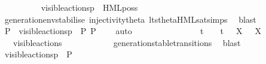 \begin{isabellebody}
\ \ \ \ \ \ \ \ \isamarkupfalse%
\ {\isacartoucheopen}{\isasymtheta}{\isacharbrackleft}{\kern0pt}visible{\isacharunderscore}{\kern0pt}actions{\isacharbrackright}{\kern0pt}{\isacharparenleft}{\kern0pt}p{\isacharparenright}{\kern0pt}\ {\isasymTurnstile}\ HML{\isacharunderscore}{\kern0pt}poss\ {\isasymalpha}\ {\isasymsigma}{\isacharparenleft}{\kern0pt}{\isasymphi}{\isacharparenright}{\kern0pt}{\isacartoucheclose}\isanewline
\ \ \ \ \ \ \ \ \ \ \isamarkupfalse%
\ generation{\isacharunderscore}{\kern0pt}env{\isacharunderscore}{\kern0pt}stabilise\ injectivity{\isacharunderscore}{\kern0pt}theta{\isacharparenleft}{\kern0pt}{}{\isacharparenright}{\kern0pt}\ lts{\isacharunderscore}{\kern0pt}theta{\isachardot}{\kern0pt}HML{\isacharunderscore}{\kern0pt}sat{\isachardot}{\kern0pt}simps{\isacharparenleft}{\kern0pt}{}{\isacharparenright}{\kern0pt}\ \isamarkupfalse%
\ blast\isanewline
\ \ \ \ \ \ \ \ \isamarkupfalse%
\ \isamarkupfalse%
\ P{\isacharprime}{\kern0pt}\ \ {\isacartoucheopen}{\isasymtheta}{\isacharbrackleft}{\kern0pt}visible{\isacharunderscore}{\kern0pt}actions{\isacharbrackright}{\kern0pt}{\isacharparenleft}{\kern0pt}p{\isacharparenright}{\kern0pt}\ {\isasymlongmapsto}\isactrlsup {\isasymtheta}{\isasymalpha}\ P{\isacharprime}{\kern0pt}{\isacartoucheclose}\ {\isacartoucheopen}P{\isacharprime}{\kern0pt}\ {\isasymTurnstile}\ {\isasymsigma}{\isacharparenleft}{\kern0pt}{\isasymphi}{\isacharparenright}{\kern0pt}{\isacartoucheclose}\ \isamarkupfalse%
\ auto\isanewline
\ \ \ \ \ \ \ \ \isamarkupfalse%
\ {\isacartoucheopen}{\isasymalpha}\ {\isasymnoteq}\ {\isasymtau}\ {\isasymand}\ {\isasymalpha}\ {\isasymnoteq}\ t\ {\isasymand}\ {\isasymalpha}\ {\isasymnoteq}\ t{\isacharunderscore}{\kern0pt}{\isasymepsilon}\ {\isasymand}\ {\isacharparenleft}{\kern0pt}{\isasymforall}\ X{\isachardot}{\kern0pt}\ {\isasymalpha}\ {\isasymnoteq}\ {\isasymepsilon}{\isacharbrackleft}{\kern0pt}X{\isacharbrackright}{\kern0pt}{\isacharparenright}{\kern0pt}{\isacartoucheclose}\ \isamarkupfalse%
\ {\isacartoucheopen}{\isasymalpha}\ {\isasymin}\ visible{\isacharunderscore}{\kern0pt}actions{\isacartoucheclose}\isanewline
\ \ \ \ \ \ \ \ \ \ \isamarkupfalse%
\ generation{\isacharunderscore}{\kern0pt}stable{\isacharunderscore}{\kern0pt}transitions\ \isamarkupfalse%
\ blast\isanewline
\ \ \ \ \ \ \ \ \isamarkupfalse%
\ {\isacartoucheopen}{\isasymtheta}{\isacharbrackleft}{\kern0pt}visible{\isacharunderscore}{\kern0pt}actions{\isacharbrackright}{\kern0pt}{\isacharparenleft}{\kern0pt}p{\isacharparenright}{\kern0pt}\ {\isasymlongmapsto}\isactrlsup {\isasymtheta}{\isasymalpha}\ P{\isacharprime}{\kern0pt}{\isacartoucheclose}\isanewline

\end{isabellebody}
